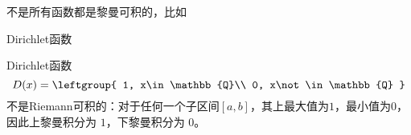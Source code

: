 



不是所有函数都是黎曼可积的，比如

\begin{example}{Dirichlet函数}

Dirichlet函数
\begin{equation}
D(x)=
\leftgroup{
    1, x\in\mathbb{Q}\\
    0, x\not\in\mathbb{Q}
}
\end{equation}
不是Riemann可积的：对于任何一个子区间$[a, b]$，其上最大值为$1$，最小值为$0$，因此上黎曼积分为 $1$，下黎曼积分为 $0$。
\end{example}
